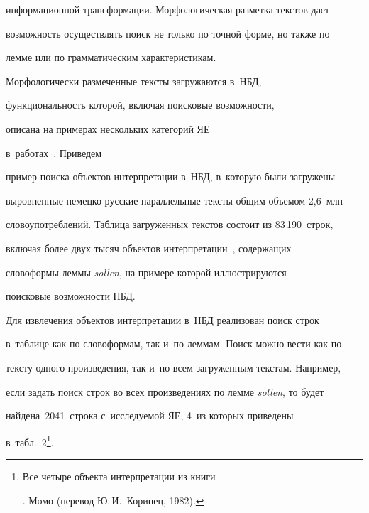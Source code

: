 информационной трансформации. Морфологическая разметка текстов дает 


возможность осуществлять поиск не только по точной форме, но также по 


лемме или по грамматическим характеристикам.


  


  Морфологически размеченные тексты загружаются в~НБД, 


  функциональность которой, включая поисковые возможности, 


описана на примерах нескольких категорий ЯЕ  


в~работах~\cite{15-gz, 16-gz, 17-gz, 18-gz, 19-gz, 20-gz, 21-gz, 22-gz}. Приведем 


пример поиска объектов интерпретации в~НБД, в~которую были загружены 


выровненные немецко-русские параллельные тексты общим объемом 2,6~млн 


словоупотреблений. Таблица загруженных текстов состоит из 83\,190~строк, 


включая более двух тысяч объектов интерпретации~\cite{6-gz}, содержащих 


словоформы леммы \textit{sollen}, на примере которой иллюстрируются 


поисковые возможности НБД.


  


  Для извлечения объектов интерпретации в~НБД реализован поиск строк 


в~таблице как по словоформам, так и~по леммам. Поиск можно вести как по 


тексту одного произведения, так и~по всем загруженным текстам. Например, 


если задать поиск строк во всех произведениях по лемме \textit{sollen}, то будет 


найдена~2041~строка с~исследуемой ЯЕ, 4~из которых приведены 


в~табл.~2\footnote{Все четыре объекта интерпретации из книги 


. Момо (перевод Ю.\,И.~Коринец, 1982).}.





